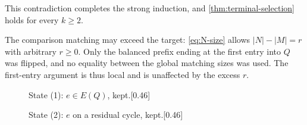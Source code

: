 \documentclass[a4paper,11pt]{article}
\newcommand{\abs}[1]{\left\lvert#1\right\rvert}
\numberwithin{equation}{section}
\begin{document}
This contradiction completes the strong induction, and
\cref{thm:terminal-selection} holds for every $k\ge 2$.

\begin{remark}\label{rem:excess}
  The comparison matching may exceed the target: \cref{eq:N-size} allows
  $\abs{N}-\abs{M}=r$ with arbitrary $r\ge 0$. Only the balanced prefix ending
  at the first entry into $Q$ was flipped, and no equality between the global
  matching sizes was used. The first-entry argument is thus local and is
  unaffected by the excess $r$.
\end{remark}

\begin{figure}[ht]
  \centering
  \begin{subcaptionbox}{State (1): $e\in E(Q)$, kept.\label{fig:state1}}[0.46\linewidth]{
    }
  \end{subcaptionbox}
  \hfill
  \begin{subcaptionbox}{State (2): $e$ on a residual cycle, kept.\label{fig:state2}}[0.46\linewidth]{
    }
  \end{subcaptionbox}

  \medskip


\end{figure}
\end{document}
